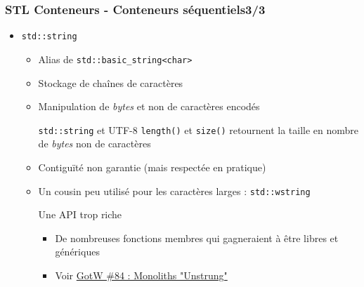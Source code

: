 \documentclass[C++.tex]{subfiles}
\begin{document}
\begin{frame}
	\frametitle{STL Conteneurs - Conteneurs séquentiels\titlehfill{}3/3}
	\begin{itemize}
		\item \lstinline|std::string|
		\begin{itemize}
			\item Alias de \lstinline|std::basic_string<char>|
			\item Stockage de chaînes de caractères
			\item Manipulation de \og \textit{bytes}\fg{} et non de caractères encodés

			\begin{alertblock}{\lstinline|std::string| et UTF-8}
				\lstinline|length()| et \lstinline|size()| retournent la taille en nombre de \textit{bytes} non de caractères
			\end{alertblock}

			\item Contiguïté non garantie (mais respectée en pratique)


			\item Un cousin peu utilisé pour les caractères larges : \lstinline|std::wstring|

			\begin{alertblock}{Une API trop riche}
				\begin{itemize}
					\item De nombreuses fonctions membres qui gagneraient à être libres et génériques
					\item Voir \href{http://www.gotw.ca/gotw/084.htm}{GotW \#84 : Monoliths "Unstrung"}
				\end{itemize}
			\end{alertblock}
		\end{itemize}
	\end{itemize}
\end{frame}
\end{document}
